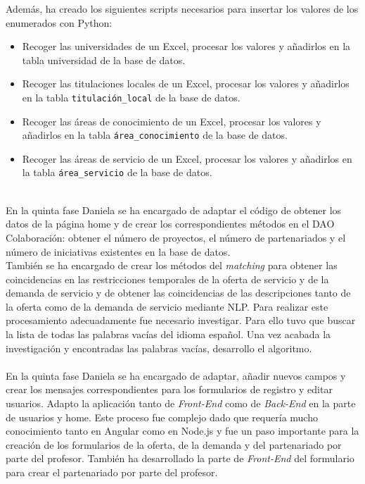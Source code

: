 \documentclass[11pt]{book}
\begin{document}
	Además, ha creado los siguientes scripts necesarios para insertar los valores de los enumerados con Python:
	\begin{itemize} 
		\item Recoger las universidades de un Excel, procesar los valores y añadirlos en la tabla universidad de la base de datos.
		\item Recoger las titulaciones locales de un Excel, procesar los valores y añadirlos en la tabla \texttt{titulación\_local} de la base de datos.
		\item Recoger las áreas de conocimiento de un Excel, procesar los valores y añadirlos en la tabla \texttt{área\_conocimiento} de la base de datos.
		\item Recoger las áreas de servicio de un Excel, procesar los valores y añadirlos en la tabla \texttt{área\_servicio} de la base de datos.\\\\
	\end{itemize}
	En la quinta fase Daniela se ha encargado de adaptar el código de obtener los datos de la página home y de crear los correspondientes métodos en el DAO Colaboración: obtener el número de proyectos, el número de partenariados y el número de iniciativas existentes en la base de datos.\\ 
	También se ha encargado de crear los métodos del \emph{matching} para obtener las coincidencias en las restricciones temporales de la oferta de servicio y de la demanda de servicio y de obtener las coincidencias de las descripciones tanto de la oferta como de la demanda de servicio mediante NLP. Para realizar este procesamiento adecuadamente fue necesario investigar. Para ello tuvo que buscar la lista de todas las palabras vacías del idioma español. Una vez acabada la investigación y encontradas las palabras vacías, desarrollo el algoritmo.\\\\
	En la quinta fase Daniela se ha encargado de adaptar, añadir nuevos campos y crear los mensajes correspondientes para los formularios de registro y editar usuarios. Adapto la aplicación tanto de \textit{ Front-End } como de \textit{ Back-End } en la parte de usuarios y home. Este proceso fue complejo dado que requería mucho conocimiento tanto en Angular como en Node.js y fue un paso importante para la creación de los formularios de la oferta, de la demanda y del partenariado por parte del profesor. También ha desarrollado la parte de \textit{ Front-End } del formulario para crear el partenariado por parte del profesor.
\end{document}
